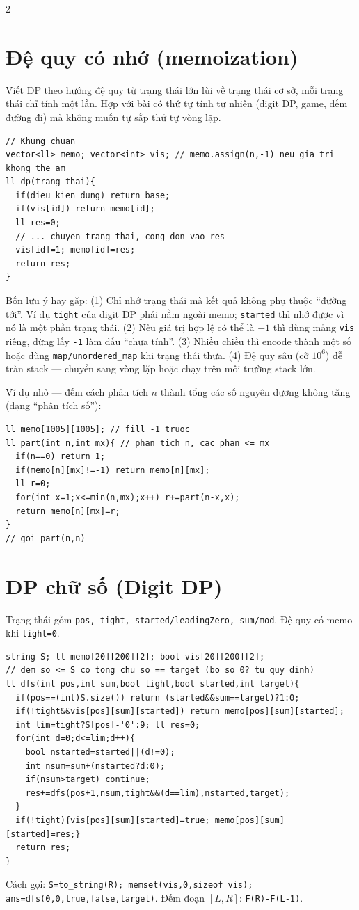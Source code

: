 \documentclass[8pt]{extarticle}
\begin{document}
\begin{multicols}{2}
\section{Đệ quy có nhớ (memoization)}
Viết DP theo hướng đệ quy từ trạng thái lớn lùi về trạng thái cơ sở, mỗi trạng thái chỉ tính một lần. Hợp với bài có thứ tự tính tự nhiên (digit DP, game, đếm đường đi) mà không muốn tự sắp thứ tự vòng lặp.
\begin{lstlisting}
// Khung chuan
vector<ll> memo; vector<int> vis; // memo.assign(n,-1) neu gia tri khong the am
ll dp(trang thai){
  if(dieu kien dung) return base;
  if(vis[id]) return memo[id];
  ll res=0;
  // ... chuyen trang thai, cong don vao res
  vis[id]=1; memo[id]=res;
  return res;
}
\end{lstlisting}
Bốn lưu ý hay gặp:
(1) Chỉ nhớ trạng thái mà kết quả không phụ thuộc ``đường tới''. Ví dụ \texttt{tight} của digit DP phải nằm ngoài memo; \texttt{started} thì nhớ được vì nó là một phần trạng thái.
(2) Nếu giá trị hợp lệ có thể là $-1$ thì dùng mảng \texttt{vis} riêng, đừng lấy \texttt{-1} làm dấu ``chưa tính''.
(3) Nhiều chiều thì encode thành một số hoặc dùng \texttt{map/unordered\_map} khi trạng thái thưa.
(4) Đệ quy sâu (cỡ $10^6$) dễ tràn stack --- chuyển sang vòng lặp hoặc chạy trên môi trường stack lớn.

Ví dụ nhỏ --- đếm cách phân tích $n$ thành tổng các số nguyên dương không tăng (dạng ``phân tích số''):
\begin{lstlisting}
ll memo[1005][1005]; // fill -1 truoc
ll part(int n,int mx){ // phan tich n, cac phan <= mx
  if(n==0) return 1;
  if(memo[n][mx]!=-1) return memo[n][mx];
  ll r=0;
  for(int x=1;x<=min(n,mx);x++) r+=part(n-x,x);
  return memo[n][mx]=r;
}
// goi part(n,n)
\end{lstlisting}

\section{DP chữ số (Digit DP)}
Trạng thái gồm \texttt{pos, tight, started/leadingZero, sum/mod}. Đệ quy có memo khi \texttt{tight=0}.
\begin{lstlisting}
string S; ll memo[20][200][2]; bool vis[20][200][2];
// dem so <= S co tong chu so == target (bo so 0? tu quy dinh)
ll dfs(int pos,int sum,bool tight,bool started,int target){
  if(pos==(int)S.size()) return (started&&sum==target)?1:0;
  if(!tight&&vis[pos][sum][started]) return memo[pos][sum][started];
  int lim=tight?S[pos]-'0':9; ll res=0;
  for(int d=0;d<=lim;d++){
    bool nstarted=started||(d!=0);
    int nsum=sum+(nstarted?d:0);
    if(nsum>target) continue;
    res+=dfs(pos+1,nsum,tight&&(d==lim),nstarted,target);
  }
  if(!tight){vis[pos][sum][started]=true; memo[pos][sum][started]=res;}
  return res;
}
\end{lstlisting}
Cách gọi: \texttt{S=to\_string(R); memset(vis,0,sizeof vis); ans=dfs(0,0,true,false,target)}. Đếm đoạn $[L,R]$: \texttt{F(R)-F(L-1)}.


\end{multicols}
\end{document}
